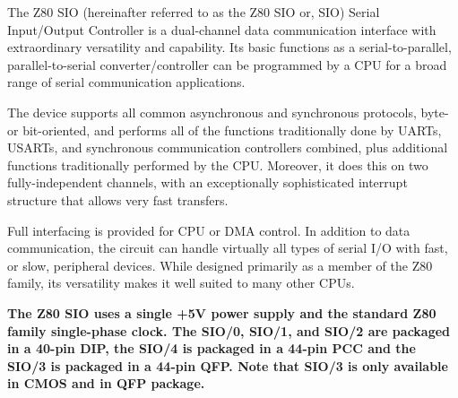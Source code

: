 \documentclass[10pt,twoside]{article}
\begin{document}
\dsrule
{}

\begin{dscols}
The Z80 SIO (hereinafter referred to as the Z80 SIO or, SIO) Serial
Input/Output Controller is a dual-channel data communication interface with
extraordinary versatility and capability. Its basic functions as a
serial-to-parallel, parallel-to-serial converter/controller can be programmed
by a CPU for a broad range of serial communication applications.

The device supports all common asynchronous and synchronous protocols, byte-
or bit-oriented, and performs all of the functions traditionally done by
UARTs, USARTs, and synchronous communication controllers combined, plus
additional functions traditionally performed by the CPU. Moreover, it does
this on two fully-independent channels, with an exceptionally sophisticated
interrupt structure that allows very fast transfers.

Full interfacing is provided for CPU or DMA control. In addition to data
communication, the circuit can handle virtually all types of serial I/O with
fast, or slow, peripheral devices. While designed primarily as a member of the
Z80 family, its versatility makes it well suited to many other CPUs.

\textbf{The Z80 SIO uses a single +5V power supply and the standard Z80 family
single-phase clock. The SIO/0, SIO/1, and SIO/2 are packaged in a 40-pin DIP,
the SIO/4 is packaged in a 44-pin PCC and the SIO/3 is packaged in a 44-pin
QFP. Note that SIO/3 is only available in CMOS and in QFP package.}
\end{dscols}

\dsrule
{}
\end{document}
